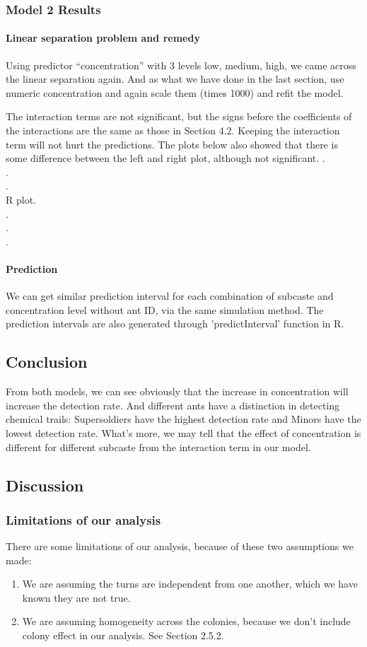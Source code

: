 \documentclass{article}
\begin{document}
	\subsubsection{Model 2 Results}
	\paragraph{Linear separation problem and remedy}
	Using predictor “concentration” with 3 levels low, medium, high, we came across the linear separation again. And as what we have done in the last section, use numeric concentration and again scale them (times 1000) and refit the model.
	
	The interaction terms are not significant, but the signs before the coefficients of the interactions are the same as those in Section 4.2. Keeping the interaction term will not hurt the predictions. The plots below also showed that there is some difference between the left and right plot, although not significant.	
		.\\
		.\\
		.\\
		R plot.\\
		.\\
		.\\
		.
	\paragraph{Prediction}
	We can get similar prediction interval for each combination of subcaste and concentration level without ant ID, via the same simulation method. The prediction intervals are also generated through 'predictInterval' function in R.
	
	\subsection{Conclusion}
	From both models, we can see obviously that the increase in concentration will increase the detection rate. And different ants have a distinction in detecting chemical trails: Supersoldiers have the highest detection rate and Minors have the lowest detection rate. What's more, we may tell that the effect of concentration is different for different subcaste from the interaction term in our model.
	
	\subsection{Discussion}
	\subsubsection{Limitations of our analysis}
	There are some limitations of our analysis, because of these two assumptions we made: 
	\begin{enumerate}
		\item We are assuming the turns are independent from one another, which we have known they are not true.
		\item We are assuming homogeneity across the colonies, because we don’t include colony effect in our analysis. See Section 2.5.2.
	\end{enumerate} 
	
\end{document}
